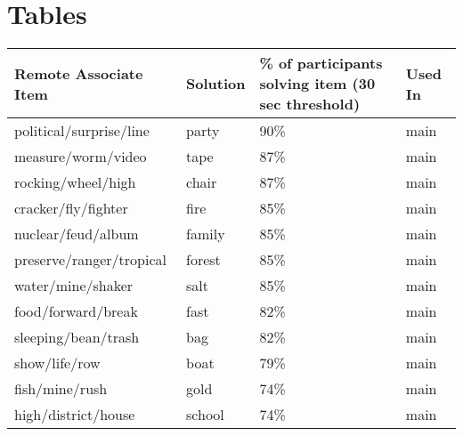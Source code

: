 \section{Tables}

\begin{table}[h!]
	\begin{tabular}{llll}
		\hline
		Remote Associate Item    & Solution & \pbox{20cm}{\% of participants \\ solving item (30 sec threshold)} & Used In \rule[-2ex]{0pt}{7ex} \\ [2ex] \hline
		political/surprise/line  & party    & 90\%                                               & main  		\\ [0.5ex]
		measure/worm/video       & tape     & 87\%                                               & main  		\\ [0.5ex]
		rocking/wheel/high       & chair    & 87\%                                               & main  		\\ [0.5ex]
		cracker/fly/fighter      & fire     & 85\%                                               & main  		\\ [0.5ex]
		nuclear/feud/album       & family   & 85\%                                               & main  		\\ [0.5ex]
		preserve/ranger/tropical & forest   & 85\%                                               & main  		\\ [0.5ex]
		water/mine/shaker        & salt     & 85\%                                               & main  		\\ [0.5ex]
		food/forward/break       & fast     & 82\%                                               & main  		\\ [0.5ex]
		sleeping/bean/trash      & bag      & 82\%                                               & main  		\\ [0.5ex]
		show/life/row            & boat     & 79\%                                               & main  		\\ [0.5ex]
		fish/mine/rush           & gold     & 74\%                                               & main  		\\ [0.5ex]
		high/district/house      & school   & 74\%                                               & main  		\\ [0.5ex]

\end{tabular}
\end{table}
